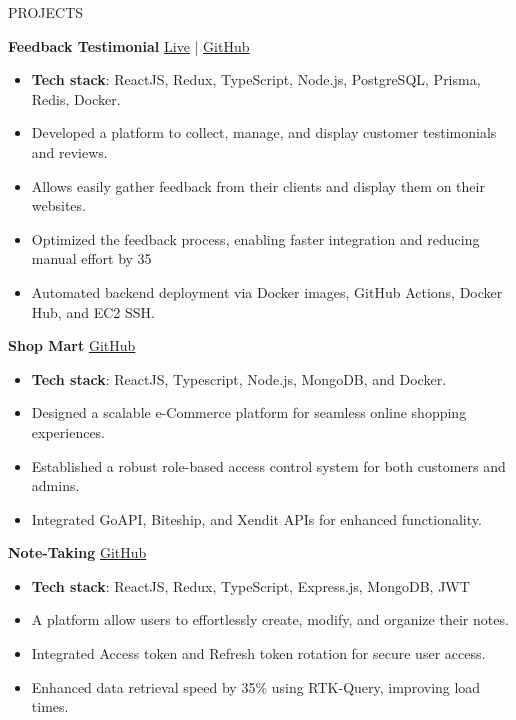\documentclass{resume}
\begin{document}
\begin{rSection}{PROJECTS}

\textbf{Feedback Testimonial} \hfill 
\href{https://testimonial.yshplsngh.in}{Live} |
\href{https://github.com/yshplsngh/Feedback-Testimonial}{GitHub}
\begin{itemize}
  \itemsep -5pt {}
  \item \textbf{Tech stack}: ReactJS, Redux, TypeScript, Node.js, PostgreSQL, Prisma, Redis, Docker.
  \item Developed a platform to collect, manage, and display customer testimonials and reviews.
  \item Allows easily gather feedback from their clients and display them on their websites.
  \item Optimized the feedback process, enabling faster integration and reducing manual effort by 35%
  \item Automated backend deployment via Docker images, GitHub Actions, Docker Hub, and EC2 SSH.

\end{itemize}

\textbf{Shop Mart} \hfill \href{https://github.com/yshplsngh/shop-mart}{GitHub}
\begin{itemize}
  \itemsep -5pt {}
    \item \textbf{Tech stack}: ReactJS, Typescript, Node.js, MongoDB, and Docker.
    \item Designed a scalable e-Commerce platform for seamless online shopping experiences.
    \item Established a robust role-based access control system for both customers and admins.
    \item Integrated GoAPI, Biteship, and Xendit APIs for enhanced functionality.

\end{itemize}

\textbf{Note-Taking} \hfill \href{https://github.com/yshplsngh/Blog-Site}{GitHub}
 \begin{itemize}
    \itemsep -6pt {}
      \item \textbf{Tech stack}: ReactJS, Redux, TypeScript, Express.js, MongoDB, JWT
      \item A platform allow users to effortlessly create, modify, and organize their notes.
      \item Integrated Access token and Refresh token rotation for secure user access.
      \item Enhanced data retrieval speed by 35\% using RTK-Query, improving load times.


\end{itemize}
\end{rSection}
\end{document}
